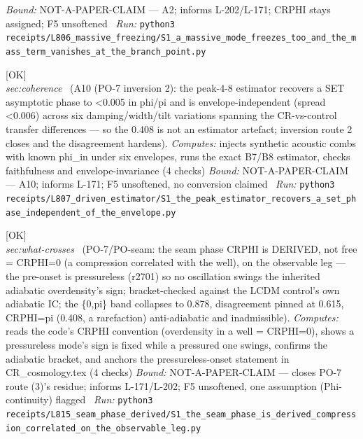 \begin{description}
 \emph{Bound:} NOT-A-PAPER-CLAIM --- A2; informs L-202/L-171; CRPHI stays assigned; F5 unsoftened
\ \emph{Run:} \texttt{python3 receipts/L806\_massive\_freezing/S1\_a\_massive\_mode\_freezes\_too\_and\_the\_mass\_term\_vanishes\_at\_the\_branch\_point.py}
\item[\label{rcpt:S1_the_peak_estimator_recovers_a_set_phase_independent_of_the_envelope}\textbf{}\quad\texttt{S1\_the\_peak\_estimator\_recovers\_a\_set\_phase\_independent\_of\_the\_envelope}]\hfill\textsf{[OK]}\\
\textit{sec:coherence} \ (A10 (PO-7 inversion 2): the peak-4-8 estimator recovers a SET asymptotic phase to <0.005 in phi/pi and is envelope-independent (spread <0.006) across six damping/width/tilt variations spanning the CR-vs-control transfer differences --- so the 0.408 is not an estimator artefact; inversion route 2 closes and the disagreement hardens). 
\emph{Computes:} injects synthetic acoustic combs with known phi\_in under six envelopes, runs the exact B7/B8 estimator, checks faithfulness and envelope-invariance (4 checks)
 \emph{Bound:} NOT-A-PAPER-CLAIM --- A10; informs L-171; F5 unsoftened, no conversion claimed
\ \emph{Run:} \texttt{python3 receipts/L807\_driven\_estimator/S1\_the\_peak\_estimator\_recovers\_a\_set\_phase\_independent\_of\_the\_envelope.py}
\item[\label{rcpt:S1_the_seam_phase_is_derived_compression_correlated_on_the_observable_leg}\textbf{}\quad\texttt{S1\_the\_seam\_phase\_is\_derived\_compression\_correlated\_on\_the\_observable\_leg}]\hfill\textsf{[OK]}\\
\textit{sec:what-crosses} \ (PO-7/PO-seam: the seam phase CRPHI is DERIVED, not free = CRPHI=0 (a compression correlated with the well), on the observable leg --- the pre-onset is pressureless (r2701) so no oscillation swings the inherited adiabatic overdensity's sign; bracket-checked against the LCDM control's own adiabatic IC; the \{0,pi\} band collapses to 0.878, disagreement pinned at 0.615, CRPHI=pi (0.408, a rarefaction) anti-adiabatic and inadmissible). 
\emph{Computes:} reads the code's CRPHI convention (overdensity in a well = CRPHI=0), shows a pressureless mode's sign is fixed while a pressured one swings, confirms the adiabatic bracket, and anchors the pressureless-onset statement in CR\_cosmology.tex (4 checks)
 \emph{Bound:} NOT-A-PAPER-CLAIM --- closes PO-7 route (3)'s residue; informs L-171/L-202; F5 unsoftened, one assumption (Phi-continuity) flagged
\ \emph{Run:} \texttt{python3 receipts/L815\_seam\_phase\_derived/S1\_the\_seam\_phase\_is\_derived\_compression\_correlated\_on\_the\_observable\_leg.py}

\end{description}
